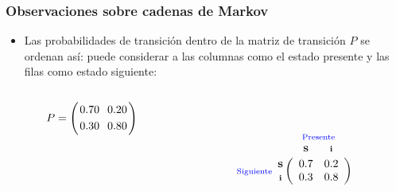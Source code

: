 {\nologo
\begin{frame}\frametitle{Observaciones sobre cadenas de Markov}
	
	\begin{itemize}\justifying 
		\item Las probabilidades de transición dentro de la matriz de transición $P$ se ordenan así: 
		puede considerar a las columnas como el estado presente y las filas como estado siguiente:
		
		\vspace{-10mm}
		\begin{columns}[c]
			\begin{column}{0.45\textwidth}
				
				\vspace{12mm}
				\[
				P =
				\left(
				\begin{array}{@{\hspace{0.2\tabcolsep}}c@{\hspace{1.2\tabcolsep}}c@{\hspace{0.2\tabcolsep}}}
				0.70 & 0.20 \\[1mm]
				0.30 & 0.80
				\end{array}
				\right)
				\]
			\end{column}

			\hspace{-10mm}
			\begin{column}{0.45\textwidth}		
				
				~ %
				\begin{figure}
					\centering
					\[	
					\begin{array}{c@{}}
					\rowind{\color{blue}Siguiente} 
					\end{array}
					\begin{array}{c@{}c@{}}
					\rowind{\textbf{S}} \\ \rowind{\textbf{i}} 
					\end{array}
					\mathop{\left(
						\begin{array}{ *{2}{c} }
						\colind{0.7}{\textbf{S}}  &  \colind{0.2}{\textbf{i}} \\[0mm]			
						0.3 & 0.8    
						\end{array}
						\right)}^{
						\begin{array}{@{}c@{}}
						\rowind{\color{blue}Presente} \\ \mathstrut
						\end{array}
					}
					\]
				\end{figure}
			\end{column}
		\end{columns}	
		

\end{itemize}
\end{frame}}
